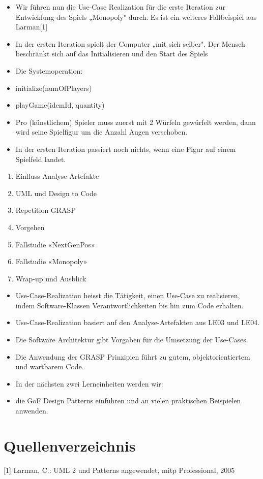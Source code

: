 \documentclass[10pt]{article}
\begin{document}
\begin{itemize}
  \item Wir führen nun die Use-Case Realization für die erste Iteration zur Entwicklung des Spiels „Monopoly" durch. Es ist ein weiteres Fallbeispiel aus Larman[1]
  \item In der ersten Iteration spielt der Computer „mit sich selber". Der Mensch beschränkt sich auf das Initialisieren und den Start des Spiels
  \item Die Systemoperation:
  \item initialize(numOfPlayers)
  \item playGame(idemId, quantity)
  \item Pro (künstlichem) Spieler muss zuerst mit 2 Würfeln gewürfelt werden, dann wird seine Spielfigur um die Anzahl Augen verschoben.
  \item In der ersten Iteration passiert noch nichts, wenn eine Figur auf einem Spielfeld landet.
\end{itemize}

\begin{enumerate}
  \item Einfluss Analyse Artefakte
  \item UML und Design to Code
  \item Repetition GRASP
  \item Vorgehen
  \item Fallstudie «NextGenPos»
  \item Fallstudie «Monopoly»
  \item Wrap-up und Ausblick
\end{enumerate}

\begin{itemize}
  \item Use-Case-Realization heisst die Tätigkeit, einen Use-Case zu realisieren, indem Software-Klassen Verantwortlichkeiten bis hin zum Code erhalten.
  \item Use-Case-Realization basiert auf den Analyse-Artefakten aus LE03 und LE04.
  \item Die Software Architektur gibt Vorgaben für die Umsetzung der Use-Cases.
  \item Die Anwendung der GRASP Prinzipien führt zu gutem, objektorientiertem und wartbarem Code.
  \item In der nächsten zwei Lerneinheiten werden wir:
  \item die GoF Design Patterns einführen und an vielen praktischen Beispielen anwenden.
\end{itemize}

\section*{Quellenverzeichnis}
[1] Larman, C.: UML 2 und Patterns angewendet, mitp Professional, 2005
\end{document}
